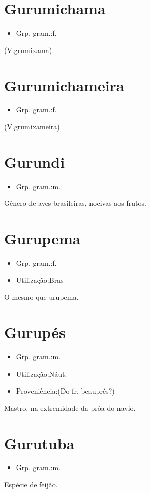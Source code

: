 \section{Gurumichama}
\begin{itemize}
\item {Grp. gram.:f.}
\end{itemize}
(V.grumixama)
\section{Gurumichameira}
\begin{itemize}
\item {Grp. gram.:f.}
\end{itemize}
(V.grumixameira)
\section{Gurundi}
\begin{itemize}
\item {Grp. gram.:m.}
\end{itemize}
Gênero de aves brasileiras, nocivas aos frutos.
\section{Gurupema}
\begin{itemize}
\item {Grp. gram.:f.}
\end{itemize}
\begin{itemize}
\item {Utilização:Bras}
\end{itemize}
O mesmo que \textunderscore urupema\textunderscore .
\section{Gurupés}
\begin{itemize}
\item {Grp. gram.:m.}
\end{itemize}
\begin{itemize}
\item {Utilização:Náut.}
\end{itemize}
\begin{itemize}
\item {Proveniência:(Do fr. \textunderscore beauprés\textunderscore ?)}
\end{itemize}
Mastro, na extremidade da prôa do navio.
\section{Gurutuba}
\begin{itemize}
\item {Grp. gram.:m.}
\end{itemize}
Espécie de feijão.
